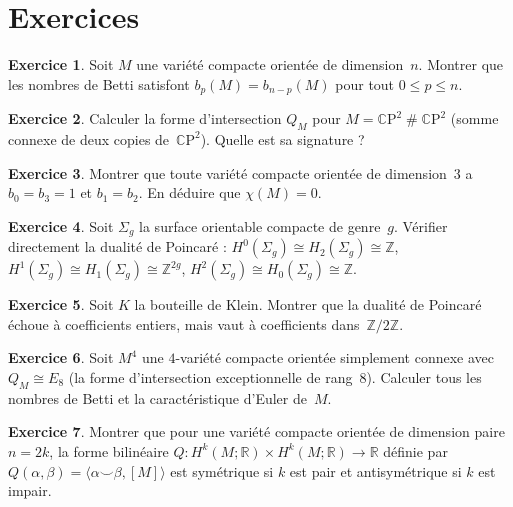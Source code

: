 \documentclass[12pt,a4paper,openany]{book}
\theoremstyle{definition}
\newtheorem{exercice}{Exercice}[chapter]
\theoremstyle{plain}
\theoremstyle{remark}
\newcommand{\Z}{\mathbb{Z}}
\newcommand{\R}{\mathbb{R}}
\newcommand{\CP}{\mathbb{C}\mathrm{P}}
\begin{document}
\section{Exercices}\label{sec:exo-poincare}

\begin{exercice}\label{exo:poincare-1}
  Soit $M$ une variété compacte orientée de dimension~$n$. Montrer que les nombres
  de Betti satisfont $b_p(M) = b_{n-p}(M)$ pour tout $0 \leq p \leq n$.
\end{exercice}

\begin{exercice}\label{exo:poincare-2}
  Calculer la forme d'intersection $Q_M$ pour $M = \CP^2 \mathbin{\#} \CP^2$
  (somme connexe de deux copies de~$\CP^2$). Quelle est sa signature ?
\end{exercice}

\begin{exercice}\label{exo:poincare-3}
  Montrer que toute variété compacte orientée de dimension~$3$ a
  $b_0 = b_3 = 1$ et $b_1 = b_2$. En déduire que $\chi(M) = 0$.
\end{exercice}

\begin{exercice}\label{exo:poincare-4}
  Soit $\Sigma_g$ la surface orientable compacte de genre~$g$. Vérifier directement
  la dualité de Poincaré : $H^0(\Sigma_g) \cong H_2(\Sigma_g) \cong \Z$,
  $H^1(\Sigma_g) \cong H_1(\Sigma_g) \cong \Z^{2g}$,
  $H^2(\Sigma_g) \cong H_0(\Sigma_g) \cong \Z$.
\end{exercice}

\begin{exercice}\label{exo:poincare-5}
  Soit $K$ la bouteille de Klein. Montrer que la dualité de Poincaré échoue à
  coefficients entiers, mais vaut à coefficients dans~$\Z/2\Z$.
\end{exercice}

\begin{exercice}\label{exo:poincare-6}
  Soit $M^4$ une $4$-variété compacte orientée simplement connexe avec
  $Q_M \cong E_8$ (la forme d'intersection exceptionnelle de rang~$8$).
  Calculer tous les nombres de Betti et la caractéristique d'Euler de~$M$.
\end{exercice}

\begin{exercice}\label{exo:poincare-7}
  Montrer que pour une variété compacte orientée de dimension paire~$n = 2k$, la
  forme bilinéaire $Q \colon H^k(M; \R) \times H^k(M; \R) \to \R$ définie par
  $Q(\alpha, \beta) = \langle \alpha \smile \beta, [M] \rangle$ est symétrique
  si $k$ est pair et antisymétrique si $k$ est impair.
\end{exercice}
\end{document}
